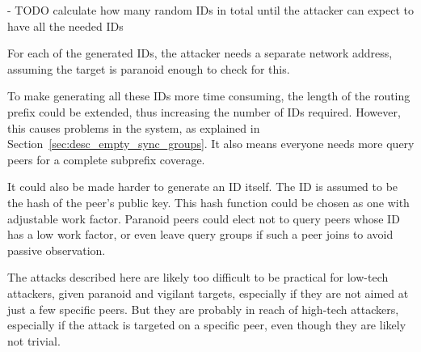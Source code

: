- TODO calculate how many random IDs in total until the attacker can expect to
  have all the needed IDs

For each of the generated IDs, the attacker needs a separate network address,
assuming the target is paranoid enough to check for this.

To make generating all these IDs more time consuming, the length of the routing
prefix could be extended, thus increasing the number of IDs required. However,
this causes problems in the system, as explained in
Section~\ref{sec:desc_empty_sync_groups}. It also means everyone needs more
query peers for a complete subprefix coverage.

It could also be made harder to generate an ID itself. The ID is assumed to be
the hash of the peer's public key. This hash function could be chosen as one
with adjustable work factor. Paranoid peers could elect not to query peers whose
ID has a low work factor, or even leave query groups if such a peer joins to
avoid passive observation.

The attacks described here are likely too difficult to be practical for low-tech
attackers, given paranoid and vigilant targets, especially if they are not aimed
at just a few specific peers. But they are probably in reach of high-tech
attackers, especially if the attack is targeted on a specific peer, even though
they are likely not trivial.
